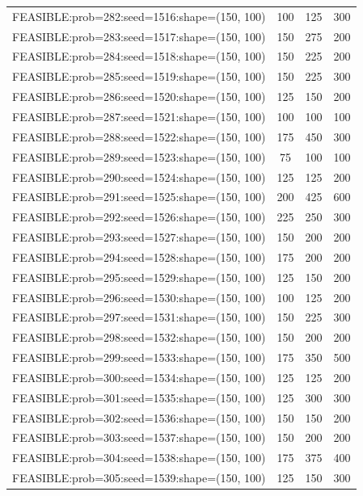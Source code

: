 \begin{longtable}{lccc}
FEASIBLE:prob=282:seed=1516:shape=(150, 100) &  100 &   125 &    300 \\
FEASIBLE:prob=283:seed=1517:shape=(150, 100) &  150 &   275 &    200 \\
FEASIBLE:prob=284:seed=1518:shape=(150, 100) &  150 &   225 &    200 \\
FEASIBLE:prob=285:seed=1519:shape=(150, 100) &  150 &   225 &    300 \\
FEASIBLE:prob=286:seed=1520:shape=(150, 100) &  125 &   150 &    200 \\
FEASIBLE:prob=287:seed=1521:shape=(150, 100) &  100 &   100 &    100 \\
FEASIBLE:prob=288:seed=1522:shape=(150, 100) &  175 &   450 &    300 \\
FEASIBLE:prob=289:seed=1523:shape=(150, 100) &   75 &   100 &    100 \\
FEASIBLE:prob=290:seed=1524:shape=(150, 100) &  125 &   125 &    200 \\
FEASIBLE:prob=291:seed=1525:shape=(150, 100) &  200 &   425 &    600 \\
FEASIBLE:prob=292:seed=1526:shape=(150, 100) &  225 &   250 &    300 \\
FEASIBLE:prob=293:seed=1527:shape=(150, 100) &  150 &   200 &    200 \\
FEASIBLE:prob=294:seed=1528:shape=(150, 100) &  175 &   200 &    200 \\
FEASIBLE:prob=295:seed=1529:shape=(150, 100) &  125 &   150 &    200 \\
FEASIBLE:prob=296:seed=1530:shape=(150, 100) &  100 &   125 &    200 \\
FEASIBLE:prob=297:seed=1531:shape=(150, 100) &  150 &   225 &    300 \\
FEASIBLE:prob=298:seed=1532:shape=(150, 100) &  150 &   200 &    200 \\
FEASIBLE:prob=299:seed=1533:shape=(150, 100) &  175 &   350 &    500 \\
FEASIBLE:prob=300:seed=1534:shape=(150, 100) &  125 &   125 &    200 \\
FEASIBLE:prob=301:seed=1535:shape=(150, 100) &  125 &   300 &    300 \\
FEASIBLE:prob=302:seed=1536:shape=(150, 100) &  150 &   150 &    200 \\
FEASIBLE:prob=303:seed=1537:shape=(150, 100) &  150 &   200 &    200 \\
FEASIBLE:prob=304:seed=1538:shape=(150, 100) &  175 &   375 &    400 \\
FEASIBLE:prob=305:seed=1539:shape=(150, 100) &  125 &   150 &    300 \\

\end{longtable}
